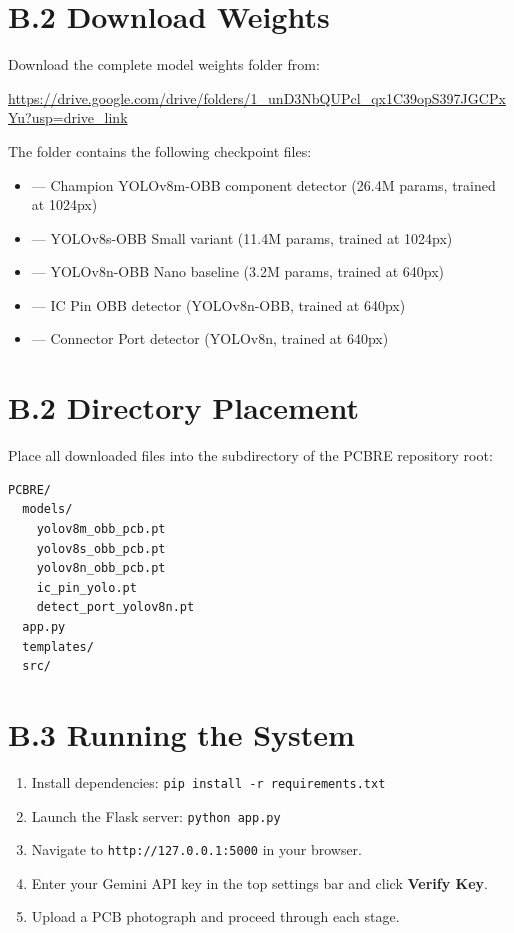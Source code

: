 \documentclass[12pt,a4paper]{report}
\begin{document}
\section*{B.2 Download Weights}
Download the complete model weights folder from:
\begin{center}
\url{https://drive.google.com/drive/folders/1_unD3NbQUPcl_qx1C39opS397JGCPxYu?usp=drive_link}
\end{center}

The folder contains the following  checkpoint files:
\begin{itemize}
  \item {} --- Champion YOLOv8m-OBB component detector (26.4M params, trained at 1024px)
  \item {} --- YOLOv8s-OBB Small variant (11.4M params, trained at 1024px)
  \item {} --- YOLOv8n-OBB Nano baseline (3.2M params, trained at 640px)
  \item {} --- IC Pin OBB detector (YOLOv8n-OBB, trained at 640px)
  \item {} --- Connector Port detector (YOLOv8n, trained at 640px)
\end{itemize}

\section*{B.2 Directory Placement}
Place all downloaded  files into the  subdirectory of the PCBRE repository root:

\begin{lstlisting}[language=bash]
PCBRE/
  models/
    yolov8m_obb_pcb.pt
    yolov8s_obb_pcb.pt
    yolov8n_obb_pcb.pt
    ic_pin_yolo.pt
    detect_port_yolov8n.pt
  app.py
  templates/
  src/
\end{lstlisting}

\section*{B.3 Running the System}
\begin{enumerate}
  \item Install dependencies: \texttt{pip install -r requirements.txt}
  \item Launch the Flask server: \texttt{python app.py}
  \item Navigate to \texttt{http://127.0.0.1:5000} in your browser.
  \item Enter your Gemini API key in the top settings bar and click \textbf{Verify Key}.
  \item Upload a PCB photograph and proceed through each stage.
\end{enumerate}
\end{document}
